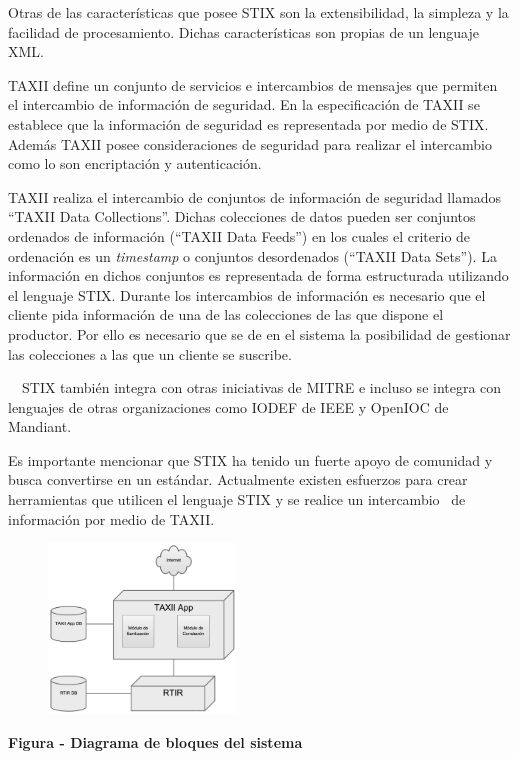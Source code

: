 \documentclass[11pt]{article}
\newcounter{Figura}
\renewcommand\theFigura{\arabic{Figura}}
\begin{document}
\bigskip

{
Otras de las características que posee STIX son la extensibilidad, la simpleza y la facilidad de procesamiento. Dichas
características son propias de un lenguaje XML.}


\bigskip

{
TAXII define un conjunto de servicios e intercambios de mensajes que permiten el intercambio de información de
seguridad. En la especificación de TAXII se establece que la información de seguridad es representada por medio de
STIX. Además TAXII posee consideraciones de seguridad para realizar el intercambio como lo son encriptación y
autenticación. }


\bigskip

{
TAXII realiza el intercambio de conjuntos de información de seguridad llamados ``TAXII Data Collections''. Dichas
colecciones de datos pueden ser conjuntos ordenados de información (``TAXII Data Feeds'') en los cuales el criterio de
ordenación es un \textit{timestamp} o conjuntos desordenados (``TAXII Data Sets''). La información en dichos conjuntos
es representada de forma estructurada utilizando el lenguaje STIX. Durante los intercambios de información es necesario
que el cliente pida información de una de las colecciones de las que dispone el productor. Por ello es necesario que se
de en el sistema la posibilidad de gestionar las colecciones a las que un cliente se suscribe.}


\bigskip

{
\ \ STIX también integra con otras iniciativas de MITRE e incluso se integra con lenguajes de otras organizaciones como
IODEF de IEEE y OpenIOC de Mandiant. }


\bigskip

{
Es importante mencionar que STIX ha tenido un fuerte apoyo de comunidad y busca convertirse en un estándar. Actualmente
existen esfuerzos para crear herramientas que utilicen el lenguaje STIX y se realice un intercambio \ de información
por medio de TAXII. }

\begin{figure}
\centering
\includegraphics[width=1.9673in,height=1.7811in]{Analisis22-img/Analisis22-img016.png}
\end{figure}
{\centering{}\bfseries
\foreignlanguage{spanish}{Figura }\stepcounter{Figura}{\theFigura}\foreignlanguage{spanish}{ -
}\foreignlanguage{spanish}{Diagrama de bloques del sistema}
\par}
\end{document}
